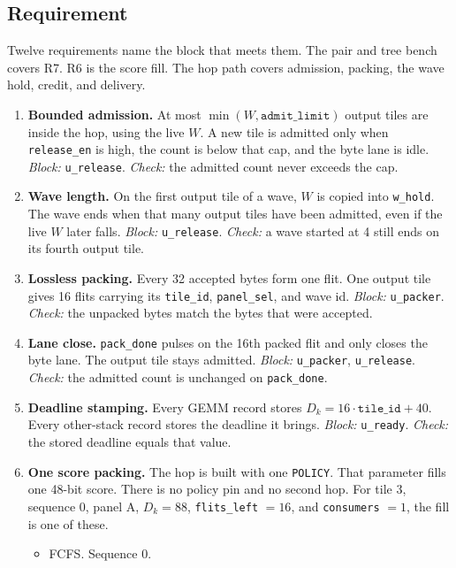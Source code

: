\documentclass[11pt,a4paper]{article}
\begin{document}
\subsection{Requirement}
Twelve requirements name the block that meets them.
The pair and tree bench covers R7.
R6 is the score fill.
The hop path covers admission, packing, the wave hold, credit, and delivery.
\begin{enumerate}[leftmargin=*, label=\textbf{R\arabic*.}]
  \item \textbf{Bounded admission.}
  At most $\min(W, \texttt{admit\_limit})$ output tiles are inside the hop, using the live $W$.
  A new tile is admitted only when \texttt{release\_en} is high, the count is below that cap, and the byte lane is idle.
  \emph{Block:} \texttt{u\_release}.
  \emph{Check:} the admitted count never exceeds the cap.
  \item \textbf{Wave length.}
  On the first output tile of a wave, $W$ is copied into \texttt{w\_hold}.
  The wave ends when that many output tiles have been admitted, even if the live $W$ later falls.
  \emph{Block:} \texttt{u\_release}.
  \emph{Check:} a wave started at 4 still ends on its fourth output tile.
  \item \textbf{Lossless packing.}
  Every 32 accepted bytes form one flit.
  One output tile gives 16 flits carrying its \texttt{tile\_id}, \texttt{panel\_sel}, and wave id.
  \emph{Block:} \texttt{u\_packer}.
  \emph{Check:} the unpacked bytes match the bytes that were accepted.
  \item \textbf{Lane close.}
  \texttt{pack\_done} pulses on the 16th packed flit and only closes the byte lane.
  The output tile stays admitted.
  \emph{Block:} \texttt{u\_packer}, \texttt{u\_release}.
  \emph{Check:} the admitted count is unchanged on \texttt{pack\_done}.
  \item \textbf{Deadline stamping.}
  Every GEMM record stores $D_k = 16\cdot\texttt{tile\_id} + 40$.
  Every other-stack record stores the deadline it brings.
  \emph{Block:} \texttt{u\_ready}.
  \emph{Check:} the stored deadline equals that value.
  \item \textbf{One score packing.}
  The hop is built with one \texttt{POLICY}.
  That parameter fills one 48-bit score.
  There is no policy pin and no second hop.
  For tile 3, sequence 0, panel A, $D_k = 88$, \texttt{flits\_left} $= 16$, and \texttt{consumers} $= 1$, the fill is one of these.
  \begin{itemize}[leftmargin=1.2em]
    \item FCFS. Sequence 0.

\end{itemize}
\end{enumerate}
\end{document}
